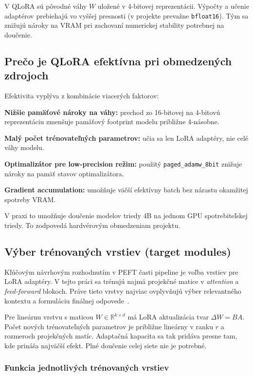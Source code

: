 V QLoRA sú pôvodné váhy $W$ uložené v 4-bitovej reprezentácii. Výpočty a učenie adaptérov prebiehajú vo vyššej presnosti (v projekte prevažne \texttt{bfloat16}). Tým sa znižujú nároky na VRAM pri zachovaní numerickej stability potrebnej na doučenie.

\subsection{Prečo je QLoRA efektívna pri obmedzených zdrojoch}

Efektivita vyplýva z kombinácie viacerých faktorov:\par\medskip
\noindent\textbf{Nižšie pamäťové nároky na váhy:} prechod zo 16-bitovej na 4-bitovú reprezentáciu zmenšuje pamäťový footprint modelu približne 4-násobne.\par\medskip
\noindent\textbf{Malý počet trénovateľných parametrov:} učia sa len LoRA adaptéry, nie celé váhy modelu.\par\medskip
\noindent\textbf{Optimalizátor pre low-precision režim:} použitý \texttt{paged\_adamw\_8bit} znižuje nároky na pamäť stavov optimalizátora.\par\medskip
\noindent\textbf{Gradient accumulation:} umožňuje väčší efektívny batch bez nárastu okamžitej spotreby VRAM.\par\medskip

V praxi to umožňuje doučenie modelov triedy 4B na jednom GPU spotrebiteľskej triedy. To zodpovedá hardvérovým obmedzeniam projektu.

\subsection{Výber trénovaných vrstiev (target modules)}

Kľúčovým návrhovým rozhodnutím v PEFT časti pipeline je voľba vrstiev pre LoRA adaptéry. V tejto práci sa trénujú najmä projekčné matice v \textit{attention} a \textit{feed-forward} blokoch. Práve tieto vrstvy najviac ovplyvňujú výber relevantného kontextu a formuláciu finálnej odpovede~\cite{Vaswani2017Attention,Hu2021LoRA}.

Pre lineárnu vrstvu s maticou $W \in \mathbb{R}^{k \times d}$ má LoRA aktualizácia tvar $\Delta W = BA$. Počet nových trénovateľných parametrov je približne lineárny v ranku $r$ a rozmeroch projekčných matíc. Adaptačná kapacita sa tak pridáva presne tam, kde prináša najväčší efekt. Plné doučenie celej siete nie je potrebné.

\subsubsection{Funkcia jednotlivých trénovaných vrstiev}

